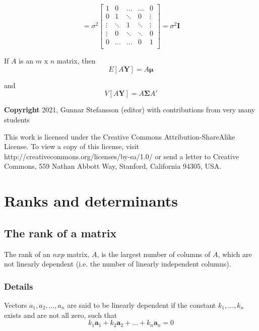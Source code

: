 \documentclass[12pt,a4paper]{article}
\theoremstyle{regla}
\theoremstyle{remark}
\theoremstyle{definition}
\theoremstyle{nonumberbreak}
\begin{document}
\[
 = 
\sigma^2
\left[
\begin{array}{ccccc}
1 & 0 & \ldots & \ldots & 0 \\
 0 & 1 & \ddots & 0  & \vdots \\
 \vdots & \ddots  & 1  & \ddots & \vdots \\
\vdots & 0 & \ddots & \ddots & 0 \\
0 & \ldots & \ldots & 0 & 1 \\ 
\end{array} \right]
= \sigma^2 \mathbf{I}
\]



If $A$ is an $m$ x $n$ matrix, then \\

$$ E[A\mathbf{Y}] = A \mathbf{\mu} $$

and
$$ V[A\mathbf{Y}] = A \boldsymbol{\Sigma} A' $$

{\bf Copyright}
2021, Gunnar Stefansson (editor) with contributions from very many students

This work is licensed under the Creative Commons
Attribution-ShareAlike License. To view a copy of this license, visit
http://creativecommons.org/licenses/by-sa/1.0/ or send a letter to
Creative Commons, 559 Nathan Abbott Way, Stanford, California 94305,
USA.
\clearpage
\section{Ranks and determinants}
\subsection{The rank of a matrix}
\begin{fbox}
\begin{minipage}{0.97\textwidth}
The rank of an $n x p$ matrix, $A$, is the largest number of columns of  $A$, which are not linearly dependent (i.e. the number of linearly independent columns).
\end{minipage}
\end{fbox}
\subsubsection{Details}
Vectors $a_1, a_2, \ldots, a_n$ are said to be linearly dependent if the constant $k_1 , \ldots, k_n$ exists and are not all zero, such that 
$$ k_1\mathbf{a}_1 + k_2 \mathbf{a}_2 + \ldots + k_n\mathbf{a}_n = 0$$
\end{document}

